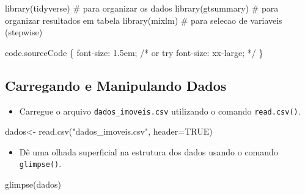\documentclass[
  letterpaper,
  DIV=11,
  numbers=noendperiod]{scrartcl}
\newenvironment{Shaded}{\begin{snugshade}}{\end{snugshade}}
\newcommand{\AttributeTok}[1]{\textcolor[rgb]{0.40,0.45,0.13}{#1}}
\newcommand{\CharTok}[1]{\textcolor[rgb]{0.13,0.47,0.30}{#1}}
\newcommand{\CommentTok}[1]{\textcolor[rgb]{0.37,0.37,0.37}{#1}}
\newcommand{\ConstantTok}[1]{\textcolor[rgb]{0.56,0.35,0.01}{#1}}
\newcommand{\DataTypeTok}[1]{\textcolor[rgb]{0.68,0.00,0.00}{#1}}
\newcommand{\DecValTok}[1]{\textcolor[rgb]{0.68,0.00,0.00}{#1}}
\newcommand{\FunctionTok}[1]{\textcolor[rgb]{0.28,0.35,0.67}{#1}}
\newcommand{\KeywordTok}[1]{\textcolor[rgb]{0.00,0.23,0.31}{#1}}
\newcommand{\NormalTok}[1]{\textcolor[rgb]{0.00,0.23,0.31}{#1}}
\newcommand{\OperatorTok}[1]{\textcolor[rgb]{0.37,0.37,0.37}{#1}}
\newcommand{\OtherTok}[1]{\textcolor[rgb]{0.00,0.23,0.31}{#1}}
\newcommand{\StringTok}[1]{\textcolor[rgb]{0.13,0.47,0.30}{#1}}
\providecommand{\tightlist}{%
  \setlength{\itemsep}{0pt}\setlength{\parskip}{0pt}}\usepackage{longtable,booktabs,array}
\begin{document}
\begin{Shaded}
\begin{Highlighting}[]
\FunctionTok{library}\NormalTok{(tidyverse)  }\CommentTok{\# para organizar os dados}
\FunctionTok{library}\NormalTok{(gtsummary)  }\CommentTok{\# para organizar resultados em tabela}
\FunctionTok{library}\NormalTok{(mixlm)      }\CommentTok{\# para selecao de variaveis (stepwise)}
\end{Highlighting}
\end{Shaded}

\begin{Shaded}
\begin{Highlighting}[]
\NormalTok{code}\FunctionTok{.sourceCode}\NormalTok{ \{}
  \KeywordTok{font{-}size}\CharTok{:} \DecValTok{1.5}\DataTypeTok{em}\OperatorTok{;}
  \CommentTok{/* or try font{-}size: xx{-}large; */}
\NormalTok{\}}
\end{Highlighting}
\end{Shaded}

\subsection{Carregando e Manipulando
Dados}\label{carregando-e-manipulando-dados}

\begin{itemize}
\tightlist
\item
  Carregue o arquivo \texttt{dados\_imoveis.csv} utilizando o comando
  \texttt{read.csv()}.
\end{itemize}

\begin{Shaded}
\begin{Highlighting}[]
\NormalTok{dados}\OtherTok{\textless{}{-}} \FunctionTok{read.csv}\NormalTok{(}\StringTok{"dados\_imoveis.csv"}\NormalTok{, }\AttributeTok{header=}\ConstantTok{TRUE}\NormalTok{)}
\end{Highlighting}
\end{Shaded}

\begin{itemize}
\tightlist
\item
  Dê uma olhada superficial na estrutura dos dados usando o comando
  \texttt{glimpse()}.
\end{itemize}

\begin{Shaded}
\begin{Highlighting}[]
\FunctionTok{glimpse}\NormalTok{(dados)}
\end{Highlighting}
\end{Shaded}
\end{document}
